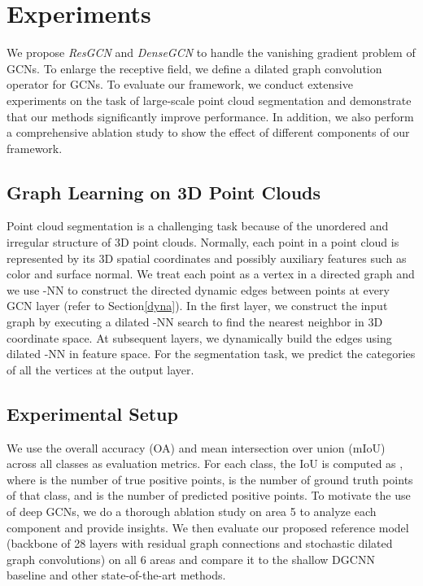 \documentclass[10pt,twocolumn,letterpaper]{article}
\newcommand{\secLabel}{Section\xspace}
\begin{document}
\section{Experiments}
\label{sec:experiments}

We propose \emph{ResGCN} and \emph{DenseGCN} to handle the vanishing gradient problem of GCNs. To enlarge the receptive field, we define a dilated graph convolution operator for GCNs. To evaluate our framework, we conduct extensive experiments on the task of large-scale point cloud segmentation and demonstrate that our methods significantly improve performance. In addition, we also perform a comprehensive ablation study to show the effect of different components of our framework.

\subsection{Graph Learning on 3D Point Clouds}
\label{sec:PCGCN}
Point cloud segmentation is a challenging task because of the unordered and irregular structure of 3D point clouds. Normally, each point in a point cloud is represented by its 3D spatial coordinates and possibly auxiliary features such as color and surface normal. We treat each point as a vertex  in a directed graph  and we use -NN to construct the directed dynamic edges between points at every GCN layer (refer to \secLabel \ref{dyna}). In the first layer, we construct the input graph  by executing a dilated -NN search to find the nearest neighbor in 3D coordinate space. At subsequent layers, we dynamically build the edges using dilated -NN in feature space. For the segmentation task, we predict the categories of all the vertices at the output layer. 

\subsection{Experimental Setup}
We use the overall accuracy (OA) and  mean intersection over union (mIoU) across all classes  as evaluation metrics. For each class, the IoU is computed as , where  is the number of true positive points,  is the number of ground truth points of that class, and  is the number of predicted positive points. To motivate the use of deep GCNs, we do a thorough ablation study on area 5 to analyze each component and provide insights. We then evaluate our proposed reference model (backbone of 28 layers with residual graph connections and stochastic dilated graph convolutions) on all 6 areas and compare it to the shallow DGCNN baseline \cite{wang2018dynamic} and other state-of-the-art methods. 
\end{document}

